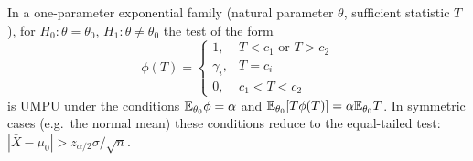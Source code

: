 \documentclass[main.tex]{subfiles}
\begin{document}
\begin{theorem}\label{thm:umpu}
In a one-parameter exponential family (natural parameter $\theta$, sufficient statistic $T$), for $H_0:\theta=\theta_0$, $H_1:\theta\ne\theta_0$ the test of the form
\[
\phi(T)=\begin{cases}1,& T<c_1\text{ or }T>c_2\\ \gamma_i,& T=c_i\\ 0,& c_1<T<c_2\end{cases}
\]
is UMPU under the conditions $\mathbb{E}_{\theta_0}\phi=\alpha$ and $\mathbb{E}_{\theta_0}[T\phi(T)]=\alpha\mathbb{E}_{\theta_0}T$. In symmetric cases (e.g.\ the normal mean) these conditions reduce to the equal-tailed test: $|\bar X-\mu_0|>z_{\alpha/2}\sigma/\sqrt n$.
\end{theorem}
\end{document}
